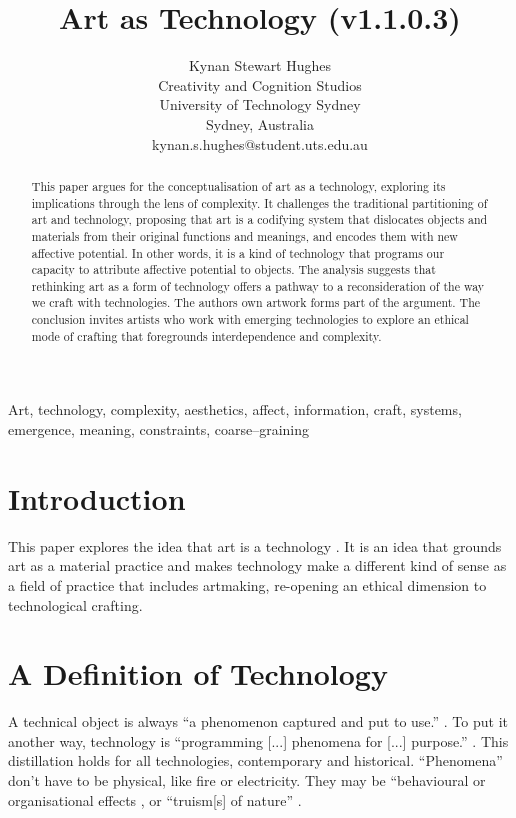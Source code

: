 \documentclass[letter:wpaper]{article}
\title{Art as Technology (v1.1.0.3)}
\author{Kynan Stewart Hughes\\
Creativity and Cognition Studios\\
University of Technology Sydney\\
Sydney, Australia\\
kynan.s.hughes@student.uts.edu.au\\
\newline
\newline
}
\begin{document}
 
\maketitle
\begin{abstract}

    This paper argues for the conceptualisation of art as a technology, exploring its implications through the lens of complexity. It challenges the traditional partitioning of art and technology, proposing that art is a codifying system that dislocates objects and materials from their original functions and meanings, and encodes them with new affective potential. In other words, it is a kind of technology that programs our capacity to attribute affective potential to objects. The analysis suggests that rethinking art as a form of technology offers a pathway to a reconsideration of the way we craft with technologies. The authors own artwork forms part of the argument. The conclusion invites artists who work with emerging technologies to explore an ethical mode of crafting that foregrounds interdependence and complexity.

\end{abstract}


Art, technology, complexity, aesthetics, affect, information, craft, systems, emergence, meaning, constraints, coarse–graining

\section{Introduction}

    This paper explores the idea that art is a technology \citep[pp.74–75]{SauvagnarguesArtmchns2016} \citep{GellThTchnlgyOfEnchntmnt1992} \citep[p.202]{ZepkeOSullivanDlzCntmprryArt2010}. It is an idea that grounds art as a material practice and makes technology make a different kind of sense as a field of practice that includes artmaking, re-opening an ethical dimension to technological crafting. 
    
\section{A Definition of Technology} 

    A technical object is always ``a phenomenon captured and put to use.'' \citep[p.53]{theNatureOfTechnology2009}. To put it another way, technology is ``programming [...] phenomena for [...] purpose.'' \citep[p.53]{theNatureOfTechnology2009}. This distillation holds for all technologies, contemporary and historical. ``Phenomena'' don't have to be physical, like fire or electricity. They may be ``behavioural or organisational  effects \citep[p.55]{theNatureOfTechnology2009}, or ``truism[s] of nature'' \citep[p.45]{theNatureOfTechnology2009}.
\end{document}
